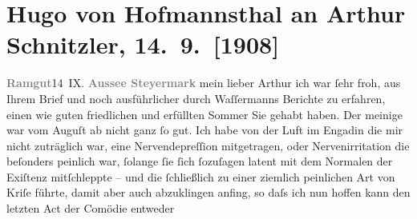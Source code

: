 

         
         \newcommand{\erwaehntePersonen}{Personen: Jakob Wassermann}
         \newcommand{\erwaehnteOrte}{Orte: Bad Aussee, Engadin, Ramgut, Rodaun, Semmering, Wien}
         \newcommand{\erwaehnteWerke}{Werke: Der Rosenkavalier, Der Weg ins Freie. Roman}
               \section[Hugo von Hofmannsthal an Arthur Schnitzler, 14. 9. {[}1908{]}]{ Hugo von Hofmannsthal an Arthur Schnitzler, 14. 9. {[}1908{]}}\nopagebreak{}\rehead{ }\begin{ledgroupsized}[t]{13cm}\normalsize\beginnumbering \toendnotes[C]{\smallbreak\pagebreak[2]} 
\toendnotes[C]{\smallbreak}\pstart
           {\pb}\textcolor{gray}{\textbf{Ramgut}}\hfill 14 IX.\pend
           \pstart
           \textcolor{gray}{\textbf{Aussee Steyermark}}\pend
           \pstart{}mein lieber Arthur\pend\pstart
           ich war ſehr froh, aus Ihrem Brief und noch ausführlicher durch Waſſermanns Berichte zu erfahren, einen wie guten friedlichen
               und erfüllten Sommer Sie gehabt haben. Der meinige war vom Auguſt ab nicht ganz ſo
               gut. Ich habe von der Luft im Engadin die mir nicht
               zuträglich war, eine Nervendepreſſion {\pb}mitgetragen, oder Nervenirritation
               die beſonders peinlich war, ſolange ſie ſich ſozuſagen latent mit dem Normalen der
               Exiſtenz mitſchleppte – und die ſchließlich zu einer ziemlich peinlichen Art von
               Kriſe führte, damit aber auch abzuklingen anfing, so daſs ich nun hoffen kann den
               letzten Act der Comödie entweder

\end{ledgroupsized}
